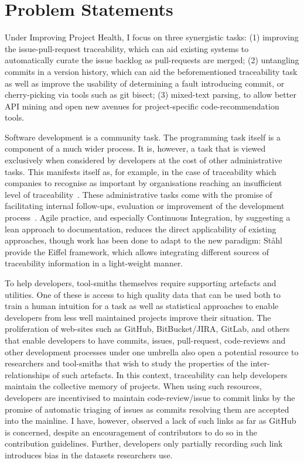 \section{Problem Statements}
\label{chapter:introduction:sec:problem_statement}

Under Improving Project Health, I focus on three synergistic tasks: (1)
improving the issue-pull-request traceability, which can aid existing systems to
automatically curate the issue backlog as pull-requests are merged; (2)
untangling commits in a version history, which can aid the beforementioned
traceability task as well as improve the usability of determining a fault
introducing commit, or cherry-picking via tools such as git bisect; (3)
mixed-text parsing, to allow better API mining and open new avenues for
project-specific code-recommendation tools. 

Software development is a community task. The programming task itself is a
component of a much wider process. It is, however, a task that is viewed
exclusively when considered by developers at the cost of other administrative
tasks. This manifests itself as, for example, in the case of traceability which
companies to recognise as important by organisations reaching an insufficient
level of traceability~\cite{mader2009motivation}. These administrative tasks
come with the promise of facilitating internal follow-ups, evaluation or
improvement of the development process~\cite{domges1998adapting}. Agile
practice, and especially Continuous Integration, by suggesting a lean approach
to documentation, reduces the direct applicability of existing approaches,
though work has been done to adapt to the new paradigm:
Ståhl~\etal~\cite{Stahl2017} provide the Eiffel framework, which allows
integrating different sources of traceability information in a light-weight
manner.

To help developers, tool-smiths themselves require supporting artefacts and
utilities. One of these is access to high quality data that can be used both to
train a human intuition for a task as well as statistical approaches to enable
developers from less well maintained projects improve their situation. The
proliferation of web-sites such as GitHub, BitBucket/JIRA, GitLab, and others
that enable developers to have commits, issues, pull-request, code-reviews and
other development processes under one umbrella also open a potential resource to
researchers and tool-smiths that wish to study the properties of the
inter-relationships of such artefacts. In this context, traceability can help
developers maintain the collective memory of projects. When using such
resources, developers are incentivised to maintain code-review/issue to commit
links by the promise of automatic triaging of issues as commits resolving them
are accepted into the mainline. I have, however, observed a lack of such links
as far as GitHub is concerned, despite an encouragement of contributors to do so
in the contribution guidelines. Further, developers only partially recording
such link introduces bias in the datasets researchers use.

